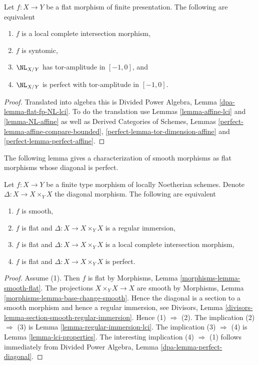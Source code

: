 \begin{lemma}
\label{lemma-flat-fp-NL-lci}
Let $f : X \to Y$ be a flat morphism of finite presentation.
The following are equivalent
\begin{enumerate}
\item $f$ is a local complete intersection morphism,
\item $f$ is syntomic,
\item $\NL_{X/Y}$ has tor-amplitude in $[-1, 0]$, and
\item $\NL_{X/Y}$ is perfect with tor-amplitude in $[-1, 0]$.
\end{enumerate}
\end{lemma}

\begin{proof}
Translated into algebra this is
Divided Power Algebra, Lemma \ref{dpa-lemma-flat-fp-NL-lci}.
To do the translation use
Lemmas \ref{lemma-affine-lci} and
\ref{lemma-NL-affine} as well as
Derived Categories of Schemes, Lemmas
\ref{perfect-lemma-affine-compare-bounded},
\ref{perfect-lemma-tor-dimension-affine} and
\ref{perfect-lemma-perfect-affine}.
\end{proof}

\noindent
The following lemma gives a characterization of smooth morphisms as flat
morphisms whose diagonal is perfect.

\begin{lemma}
\label{lemma-smooth-diagonal-perfect}
Let $f : X \to Y$ be a finite type morphism of locally Noetherian schemes.
Denote $\Delta : X \to X \times_Y X$ the diagonal morphism.
The following are equivalent
\begin{enumerate}
\item $f$ is smooth,
\item $f$ is flat and $\Delta : X \to X \times_Y X$ is a regular immersion,
\item $f$ is flat and $\Delta : X \to X \times_Y X$ is a
local complete intersection morphism,
\item $f$ is flat and $\Delta : X \to X \times_Y X$ is perfect.
\end{enumerate}
\end{lemma}

\begin{proof}
Assume (1). Then $f$ is flat by
Morphisms, Lemma \ref{morphisms-lemma-smooth-flat}.
The projections $X \times_Y X \to X$ are smooth by
Morphisms, Lemma \ref{morphisms-lemma-base-change-smooth}. Hence the diagonal
is a section to a smooth morphism and hence a regular immersion, see
Divisors, Lemma \ref{divisors-lemma-section-smooth-regular-immersion}.
Hence (1) $\Rightarrow$ (2).
The implication (2) $\Rightarrow$ (3) is
Lemma \ref{lemma-regular-immersion-lci}.
The implication (3) $\Rightarrow$ (4) is
Lemma \ref{lemma-lci-properties}.
The interesting implication (4) $\Rightarrow$ (1) follows immediately
from Divided Power Algebra, Lemma \ref{dpa-lemma-perfect-diagonal}.
\end{proof}

